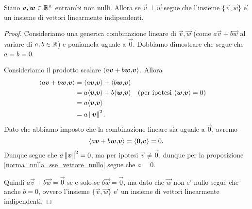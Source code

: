 \begin{proposition}
    \label{ortogonali=>indip_2}
    Siano $\bm{v}, \bm{w} \in \mathbb{R}^n$ entrambi non nulli. Allora se $\vec v \perp \vec w$ segue che l'insieme $\{\vec v, \vec w\}$ e' un insieme di vettori linearmente indipendenti.
\end{proposition}
\begin{proof}
    Consideriamo una generica combinazione lineare di $\vec v, \vec w$ (come $a\vec v + b \vec w$ al variare di $a, b \in \mathbb{R}$) e poniamola uguale a $\vec 0$. Dobbiamo dimostrare che segue che $a = b = 0$.

    Consideriamo il prodotto scalare $\langle a\bm{v} + b \bm{w}{,}\bm{v}\rangle$. Allora \begin{align*}
        \langle a\bm{v} + b \bm{w}{,}\bm{v}\rangle &= \langle a\bm{v}{,}\bm{v}\rangle +  \langle b\bm{w}{,}\bm{v}\rangle \\
        &= a\langle \bm{v}{,}\bm{v}\rangle + b\langle \bm{w}{,}\bm{v}\rangle &&\text{(per ipotesi $\langle \bm{w}{,}\bm{v}\rangle = 0$)} \\
        &= a\langle \bm{v}{,}\bm{v}\rangle \\
        &= a\left\lVert\bm{v}\right\rVert^2.
    \end{align*}
    Dato che abbiamo imposto che la combinazione lineare sia uguale a $\vec 0$, avremo \[
        \langle a\bm{v} + b \bm{w}{,}\bm{v}\rangle = \langle \bm{0}{,}\bm{v}\rangle = 0.    
    \]
    Dunque segue che $a\left\lVert\bm{v}\right\rVert^2 = 0$, ma per ipotesi $\vec v \neq \vec 0$, dunque per la proposizione \ref{norma_nulla_sse_vettore_nullo} segue che $a = 0$.

    Quindi $a\vec v + b\vec w = \vec 0$ se e solo se $b \vec w = \vec 0$, ma dato che $\vec w$ non e' nullo segue che anche $b = 0$, ovvero l'insieme $\{\vec v, \vec w\}$ e' un insieme di vettori linearmente indipendenti.
\end{proof}

